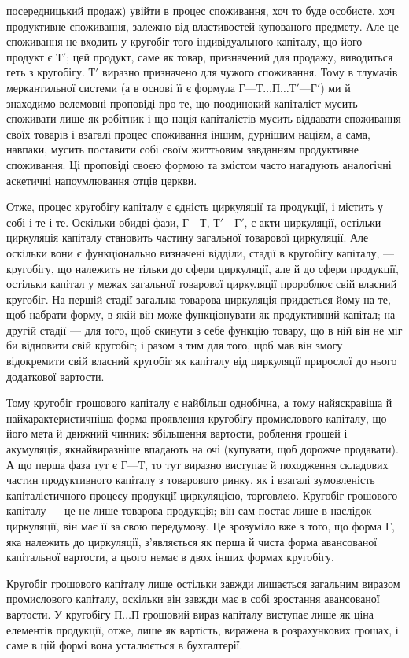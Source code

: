 \parcont{}  %
посередницький продаж) увійти в процес споживання, хоч то буде
особисте, хоч продуктивне споживання, залежно від властивостей купованого
предмету. Але це споживання не входить у кругобіг того індивідуального
капіталу, що його продукт є $Т'$; цей продукт, саме як товар,
призначений для продажу, виводиться геть з кругобігу. $Т'$ виразно
призначено для чужого споживання. Тому в тлумачів меркантильної
системи (а в основі її є формула $Г — Т\dots{} П\dots{} Т' — Г'$) ми й знаходимо
велемовні проповіді про те, що поодинокий капіталіст мусить споживати
лише як робітник і що нація капіталістів мусить віддавати споживання
своїх товарів і взагалі процес споживання іншим, дурнішим
націям, а сама, навпаки, мусить поставити собі своїм життьовим
завданням продуктивне споживання. Ці проповіді своєю формою та
змістом часто нагадують аналогічні аскетичні напоумлювання отців
церкви.

Отже, процес кругобігу капіталу є єдність циркуляції та продукції,
і містить у собі і те і те. Оскільки обидві фази, $Г — Т$, $Т' — Г'$, є акти
циркуляції, остільки циркуляція капіталу становить частину загальної
товарової циркуляції. Але оскільки вони є функціонально визначені відділи,
стадії в кругобігу капіталу, — кругобігу, що належить не тільки до
сфери циркуляції, але й до сфери продукції, остільки капітал у межах
загальної товарової циркуляції пророблює свій власний кругобіг. На першій
стадії загальна товарова циркуляція придається йому на те, щоб набрати
форму, в якій він може функціонувати як продуктивний капітал; на
другій стадії — для того, щоб скинути з себе функцію товару, що в ній
він не міг би відновити свій кругобіг; і разом з тим для того, щоб мав
він змогу відокремити свій власний кругобіг як капіталу від циркуляції
прирослої до нього додаткової вартости.

\vtyagnut
Тому кругобіг грошового капіталу є найбільш однобічна, а тому
найяскравіша й найхарактеристичніша форма проявлення кругобігу промислового
капіталу, що його мета й движний чинник: збільшення вартости,
роблення грошей і акумуляція, якнайвиразніше впадають на очі (купувати,
щоб дорожче продавати). А що перша фаза тут є $Г — Т$, то тут
виразно виступає й походження складових частин продуктивного капіталу
з товарового ринку, як і взагалі зумовленість капіталістичного процесу
продукції циркуляцією, торговлею. Кругобіг грошового капіталу — це не
лише товарова продукція; він сам постає лише в наслідок циркуляції, він
має її за свою передумову. Це зрозуміло вже з того, що форма $Г$, яка
належить до циркуляції, з’являється як перша й чиста форма авансованої
капітальної вартости, а цього немає в двох інших формах кругобігу.

Кругобіг грошового капіталу лише остільки завжди лишається загальним
виразом промислового капіталу, оскільки він завжди має в собі зростання
авансованої вартости. У кругобігу $П\dots{} П$ грошовий вираз капіталу
виступає лише як ціна елементів продукції, отже, лише як вартість,
виражена в розрахункових грошах, і саме в цій формі вона усталюється
в бухгалтерії.
